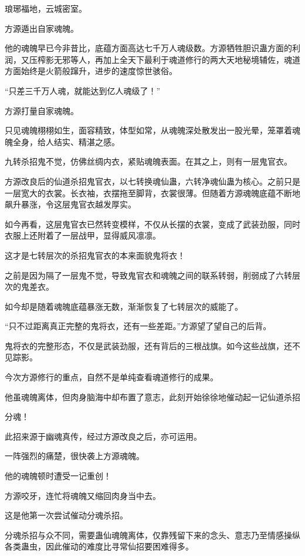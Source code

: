 
\begin{this_body}

琅琊福地，云城密室。

方源遁出自家魂魄。

他的魂魄早已今非昔比，底蕴方面高达七千万人魂级数。方源牺牲胆识蛊方面的利润，又压榨影无邪等人，再加上全天下最利于魂道修行的两大天地秘境辅佐，魂道方面始终是火箭般蹿升，进步的速度惊世骇俗。

“只差三千万人魂，就能达到亿人魂级了！”

方源打量自家魂魄。

只见魂魄栩栩如生，面容精致，体型如常，从魂魄深处散发出一股光晕，笼罩着魂魄全身，给人结实、精湛之感。

九转杀招鬼不觉，仿佛丝绸内衣，紧贴魂魄表面。在其之上，则有一层鬼官衣。

方源改良后的仙道杀招鬼官衣，以七转换魂仙蛊，六转净魂仙蛊为核心。之前只是一层宽大的衣裳。长衣袖，衣摆拖至脚背，衣裳很薄。但随着方源魂魄底蕴不断地飙升暴涨，令这层鬼官衣越发厚实。

如今再看，这层鬼官衣已然转变模样，不仅从长摆的衣裳，变成了武装劲服，同时衣服上还附着了一层战甲，显得威风凛凛。

这才是七转层次的杀招鬼官衣的本来面貌鬼将衣！

之前是因为隔了一层鬼不觉，导致鬼官衣和魂魄之间的联系转弱，削弱成了六转层次的鬼差衣。

如今却是随着魂魄底蕴暴涨无数，渐渐恢复了七转层次的威能了。

“只不过距离真正完整的鬼将衣，还有一些差距。”方源望了望自己的后背。

鬼将衣的完整形态，不仅是武装劲服，还有背后的三根战旗。如今这些战旗，还不见踪影。

今次方源修行的重点，自然不是单纯查看魂道修行的成果。

他虽魂魄离体，但肉身脑海中却布置了意志，此刻开始徐徐地催动起一记仙道杀招

分魂！

此招来源于幽魂真传，经过方源改良之后，亦可运用。

一阵强烈的痛楚，很快袭上方源魂魄。

他的魂魄顿时遭受一记重创！

方源咬牙，连忙将魂魄又缩回肉身当中去。

这是他第一次尝试催动分魂杀招。

分魂杀招与众不同，需要蛊仙魂魄离体，仅靠残留下来的念头、意志乃至情感操纵各类蛊虫，因此催动的难度比寻常仙招要困难得多。


\end{this_body}
